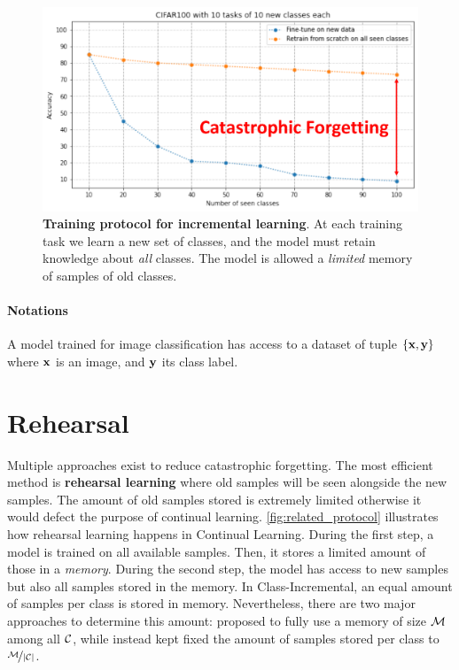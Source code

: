 \begin{figure}[tb]
    \begin{center}
        \includegraphics[width=0.8\linewidth]{images/related/catastrophic_forgetting.pdf}
    \end{center}
    \caption{\textbf{Training protocol for incremental learning}. At each training task we learn a
        new set of classes, and the model must retain knowledge about \textit{all} classes. The
        model is allowed a \textit{limited} memory of samples of old classes.}
    \label{fig:related_forgetting}
\end{figure}

\paragraph{Notations} A model trained for image classification has access to a dataset of tuple
$\{\mathbf{x}, \mathbf{y}\}$ where $\mathbf{x}$ is an image, and $\mathbf{y}$ its class label.

\section{Rehearsal}

Multiple approaches exist to reduce catastrophic forgetting. The most efficient method is
\textbf{rehearsal learning} where old samples will be seen alongside the new samples. The amount of
old samples stored is extremely limited otherwise it would defect the purpose of continual learning.
\autoref{fig:related_protocol} illustrates how rehearsal learning happens in Continual Learning.
During the first step, a model is trained on all available samples. Then, it stores a limited amount
of those in a \textit{memory}. During the second step, the model has access to new samples but also
all samples stored in the memory. In Class-Incremental, an equal amount of samples per class is
stored in memory. Nevertheless, there are two major approaches to determine this amount:
\cite{rebuffi2017icarl} proposed to fully use a memory of size $\mathcal{M}$ among all $\mathcal{C}$, while
\cite{hou2019ucir} instead kept fixed the amount of samples stored per class to $\nicefrac{\mathcal{M}}{|\mathcal{C}|}$.

